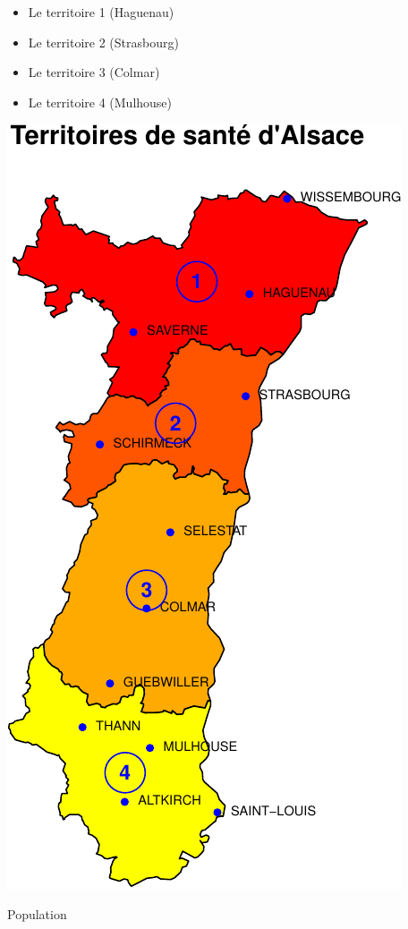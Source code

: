 \documentclass[]{article}
\begin{document}
\begin{itemize}
\itemsep1pt\parskip0pt
\item
  Le territoire 1 (Haguenau)
\item
  Le territoire 2 (Strasbourg)
\item
  Le territoire 3 (Colmar)
\item
  Le territoire 4 (Mulhouse)
\end{itemize}

\includegraphics{Figs/unnamed-chunk-44-1.pdf}

Population
\end{document}
